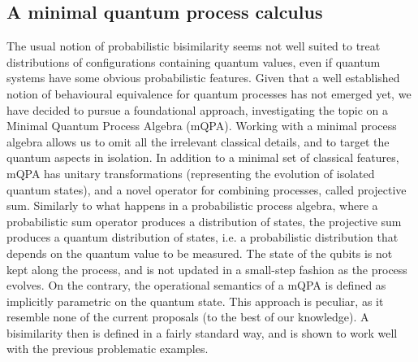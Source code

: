 \subsection*{A minimal quantum process calculus}
 
The usual notion of probabilistic bisimilarity seems not well suited to treat distributions of configurations containing quantum values, even if quantum systems have some obvious probabilistic features. Given that a well established notion of behavioural equivalence for quantum processes has not emerged yet, we have decided to pursue a foundational approach, investigating the topic on a Minimal Quantum Process Algebra (mQPA).
Working with a minimal process algebra allows us to omit all the irrelevant classical details, and to target the quantum aspects in isolation.
In addition to a minimal set of classical features, mQPA has unitary transformations (representing the evolution of isolated quantum states),
and a novel operator for combining processes, called projective sum.
Similarly to what happens in a probabilistic process algebra, where a probabilistic sum operator produces a distribution
of states, the projective sum produces a quantum distribution of states, i.e. a probabilistic distribution that depends on the quantum value
to be measured.
The state of the qubits is not kept along the process, and is not updated in a small-step fashion as the process evolves.
On the contrary, the operational semantics of a mQPA is defined as implicitly parametric on the quantum state.
This approach is peculiar, as it resemble none of the current proposals (to the best of our knowledge).
A bisimilarity then is defined in a fairly standard way, and is shown to work well with the previous problematic examples.
 